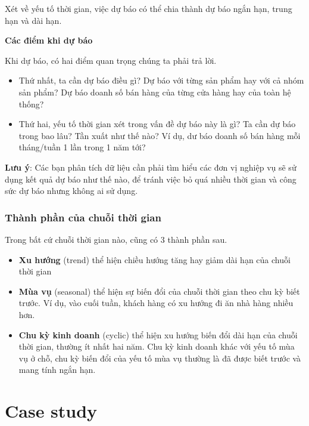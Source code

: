 \documentclass[]{krantz}
\providecommand{\tightlist}{%
  \setlength{\itemsep}{0pt}\setlength{\parskip}{0pt}}
\renewenvironment{quote}{\begin{VF}}{\end{VF}}
\theoremstyle{definition}
\theoremstyle{definition}
\theoremstyle{definition}
\theoremstyle{remark}
\begin{document}
Xét về yếu tố thời gian, việc dự báo có thể chia thành dự báo ngắn hạn,
trung hạn và dài hạn.

\textbf{Các điểm khi dự báo}

Khi dự báo, có hai điểm quan trọng chúng ta phải trả lời.

\begin{itemize}
\tightlist
\item
  Thứ nhất, ta cần dự báo điều gì? Dự báo với từng sản phẩm hay với cả
  nhóm sản phẩm? Dự báo doanh số bán hàng của từng cửa hàng hay của toàn
  hệ thống?
\item
  Thứ hai, yếu tố thời gian xét trong vấn đề dự báo này là gì? Ta cần dự
  báo trong bao lâu? Tần xuất như thế nào? Ví dụ, dư báo doanh số bán
  hàng mỗi tháng/tuần 1 lần trong 1 năm tới?
\end{itemize}

\begin{quote}
\textbf{Lưu ý}: Các bạn phân tích dữ liệu cần phải tìm hiểu các đơn vị
nghiệp vụ sẽ sử dụng kết quả dự báo như thế nào, để tránh việc bỏ quá
nhiều thời gian và công sức dự báo nhưng không ai sử dụng.
\end{quote}

\hypertarget{thanh-phn-cua-chui-thi-gian}{%
\section{Thành phần của chuỗi thời
gian}\label{thanh-phn-cua-chui-thi-gian}}

Trong bất cứ chuỗi thời gian nào, cũng có 3 thành phần sau.

\begin{itemize}
\tightlist
\item
  \textbf{Xu hướng} (trend) thể hiện chiều hướng tăng hay giảm dài hạn
  của chuỗi thời gian
\item
  \textbf{Mùa vụ} (seasonal) thể hiện sự biến đổi của chuỗi thời gian
  theo chu kỳ biết trước. Ví dụ, vào cuối tuần, khách hàng có xu hướng
  đi ăn nhà hàng nhiều hơn.
\item
  \textbf{Chu kỳ kinh doanh} (cyclic) thể hiện xu hướng biến đổi dài hạn
  của chuỗi thời gian, thường ít nhất hai năm. Chu kỳ kinh doanh khác
  với yếu tố mùa vụ ở chỗ, chu kỳ biến đổi của yếu tố mùa vụ thường là
  đã được biết trước và mang tính ngắn hạn.
\end{itemize}

\mainmatter

\hypertarget{part-case-study}{%
\part{Case study}\label{part-case-study}}
\end{document}
